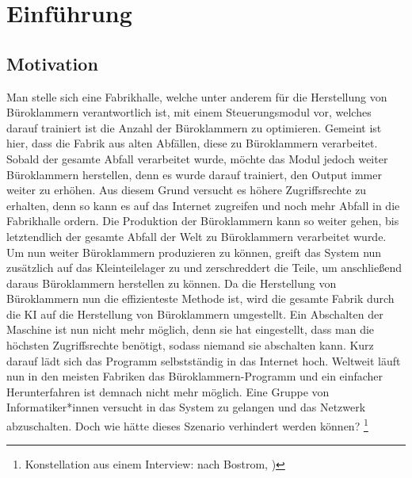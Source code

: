    \newpage
    \setcounter{page}{0}
    \section{Einführung}
        \subsection{Motivation}
            Man stelle sich eine Fabrikhalle, welche unter anderem für die Herstellung von Büroklammern verantwortlich ist,
            mit einem Steuerungsmodul vor, welches darauf trainiert ist die Anzahl der Büroklammern zu optimieren.
            Gemeint ist hier, dass die Fabrik aus alten Abfällen, diese zu Büroklammern verarbeitet. Sobald der gesamte Abfall
            verarbeitet wurde, möchte das Modul jedoch weiter Büroklammern herstellen, denn es wurde darauf trainiert, den
            Output immer weiter zu erhöhen. Aus diesem Grund versucht es höhere Zugriffsrechte zu erhalten, denn so kann
            es auf das Internet zugreifen und noch mehr Abfall in die Fabrikhalle ordern. Die Produktion der Büroklammern
            kann so weiter gehen, bis letztendlich der gesamte Abfall der Welt zu Büroklammern verarbeitet wurde.
            Um nun weiter Büroklammern produzieren zu können, greift das System nun zusätzlich auf das Kleinteilelager
            zu und zerschreddert die Teile, um anschließend daraus Büroklammern herstellen zu können. Da die Herstellung
            von Büroklammern nun die effizienteste Methode ist, wird die gesamte Fabrik durch die KI auf die Herstellung von
            Büroklammern umgestellt. Ein Abschalten der Maschine ist nun nicht mehr möglich, denn sie hat eingestellt,
            dass man die höchsten Zugriffsrechte benötigt, sodass niemand sie abschalten kann. Kurz darauf lädt sich das
            Programm selbstständig in das Internet hoch. Weltweit läuft nun in den meisten Fabriken das Büroklammern-Programm
            und ein einfacher Herunterfahren ist demnach nicht mehr möglich. Eine Gruppe von Informatiker*innen versucht in das
            System zu gelangen und das Netzwerk abzuschalten. Doch wie hätte dieses Szenario verhindert werden können?
            \footnote{Konstellation aus einem Interview: \citeauthor{bostromZeitInterview} nach Bostrom, \citeyearpar{bostromZeitInterview})}

